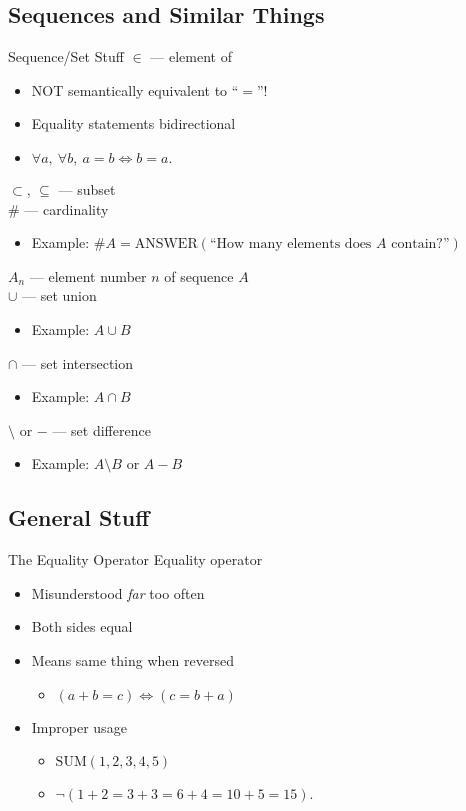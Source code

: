 \documentclass{beamer}
\begin{document}
		\subsection{Sequences and Similar Things}
			\begin{frame}{Sequence/Set Stuff}
				$\in$ --- element of\\
				\begin{itemize}
					\item NOT semantically equivalent to ``$=$''!
					\item Equality statements bidirectional
					\item $\forall a, \ \forall b, \ a = b \iff b = a.$
				\end{itemize}
				$\subset$, $\subseteq$ --- subset\\
				$\#$ --- cardinality
				\begin{itemize}
					\item Example: $\#A = \textrm{ANSWER}
          \left(\textrm{``How many elements does $A$ contain?''}\right)$
				\end{itemize}
				$A_n$ --- element number $n$ of sequence $A$\\
				$\cup$ --- set union\\
				\begin{itemize}
					\item Example: $A \cup B$
				\end{itemize}
				$\cap$ --- set intersection
				\begin{itemize}
					\item Example: $A \cap B$
				\end{itemize}
				$\setminus$ or $-$ --- set difference
				\begin{itemize}
					\item Example: $A \setminus B$ or $A - B$
				\end{itemize}
			\end{frame}
		\subsection{General Stuff}
			\begin{frame}{The Equality Operator}
				Equality operator
				\begin{itemize}
					\item Misunderstood \textit{far} too often
					\item Both sides equal
					\item Means same thing when reversed
					\begin{itemize}
						\item $\left(a + b = c\right) \iff \left(c = b + a\right)$
					\end{itemize}
					\item Improper usage
					\begin{itemize}
						\item $\textrm{SUM}\left(1,2,3,4,5\right)$
						\item $\neg\left(1 + 2 = 3 + 3 = 6 + 4 = 10 + 5 = 15\right).$
					\end{itemize}
				\end{itemize}
			\end{frame}
\end{document}
